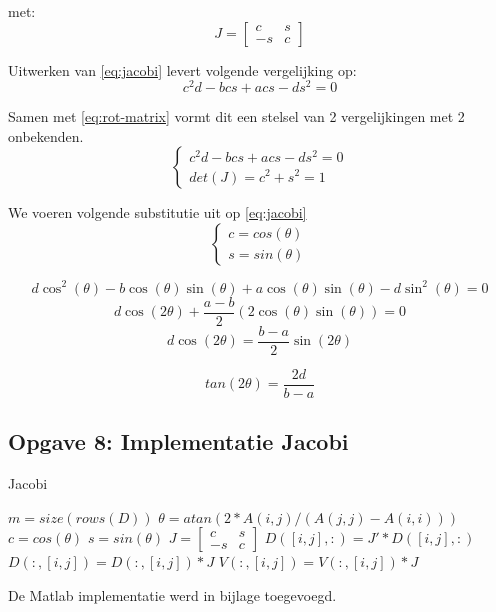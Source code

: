 \documentclass[a4paper]{article}
\newcommand{\opgave}[1]{\subsection{Opgave #1}}
\begin{document}
met: $$J = \begin{bmatrix}
c & s \\ -s & c
\end{bmatrix}$$

Uitwerken van \ref{eq:jacobi} levert volgende vergelijking op:
\begin{equation}
c^2d-bcs+acs-ds^2 = 0
\end{equation}

Samen met \ref{eq:rot-matrix} vormt dit een stelsel van 2 vergelijkingen met 2 onbekenden.
$$\begin{cases}
c^2d-bcs+acs-ds^2 = 0 \\ det(J) = c^2 + s^2 = 1
\end{cases}$$

We voeren volgende substitutie uit op \ref{eq:jacobi}
\begin{equation}
\begin{cases}
c = cos(\theta) \\ s = sin(\theta)
\end{cases}
\end{equation}

$$ d \cos^2(\theta) - b \cos(\theta) \sin(\theta) + a \cos(\theta) \sin(\theta) - d \sin^2(\theta) = 0$$
$$ d \cos(2\theta) + \frac{a-b}{2}(2 \cos(\theta)\sin(\theta)) = 0 $$
$$ d \cos(2\theta) = \frac{b-a}{2}\sin(2\theta)$$

\begin{equation}
tan(2\theta) = \frac{2d}{b-a}
\end{equation}

\opgave{8: Implementatie Jacobi}\label{sec:oef8}

\begin{algorithm}
\begin{algorithmic}[H]\label{alg:SI}\caption{Jacobi}
\State $m = size(rows(D))$
\State $\theta = atan(2*A(i,j)/(A(j,j) - A(i,i)))$
\State $c = cos(\theta)$
\State $s = sin(\theta)$
\State $J = \begin{bmatrix}c & s \\ -s & c \end{bmatrix}$
\State $D([i, j], :) = J' * D([i, j], :)$
\State $D(:, [i, j]) = D(:, [i, j]) * J$
\State $V(:, [i, j]) = V(:, [i, j]) * J$
\EndFor
\EndFor
\EndWhile
\end{algorithmic}
\end{algorithm}

De Matlab implementatie werd in bijlage toegevoegd.
\end{document}
